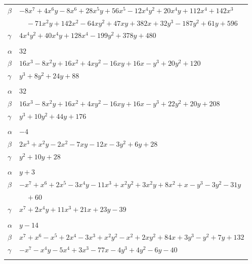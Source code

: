 \documentclass[11pt]{article}
\begin{document}
\begin{longtable}{@{}ll@{}}
$\beta$ & $-8x^{7}+4x^{6}y-8x^{6}+28x^{5}y+56x^{5}-12x^{4}y^{2}+20x^{4}y+112x^{4}+142x^{3}$\\
 & $\quad -71x^{2}y+142x^{2}-64xy^{2}+47xy+382x+32y^{3}-187y^{2}+61y+596$\\
$\gamma$ & $4x^{4}y^{2}+40x^{4}y+128x^{4}-199y^{2}+378y+480$\\
\addlinespace[3pt]
\multicolumn{2}{@{}l}{$\{i,j\}=\{37,38\}$, $k_{ij}=2^{5}\cdot 3$}\\
$\alpha$ & $32$\\
$\beta$ & $16x^{3}-8x^{2}y+16x^{2}+4xy^{2}-16xy+16x-y^{3}+20y^{2}+120$\\
$\gamma$ & $y^{3}+8y^{2}+24y+88$\\
\addlinespace[3pt]
\multicolumn{2}{@{}l}{$\{i,j\}=\{37,39\}$, $k_{ij}=2^{5}\cdot 5^{2}$}\\
$\alpha$ & $32$\\
$\beta$ & $16x^{3}-8x^{2}y+16x^{2}+4xy^{2}-16xy+16x-y^{3}+22y^{2}+20y+208$\\
$\gamma$ & $y^{3}+10y^{2}+44y+176$\\
\addlinespace[3pt]
\multicolumn{2}{@{}l}{$\{i,j\}=\{39,44\}$, $k_{ij}=2^{2}\cdot 3^{3}$}\\
$\alpha$ & $-4$\\
$\beta$ & $2x^{3}+x^{2}y-2x^{2}-7xy-12x-3y^{2}+6y+28$\\
$\gamma$ & $y^{2}+10y+28$\\
\addlinespace[3pt]
\multicolumn{2}{@{}l}{$\{i,j\}=\{40,43\}$, $k_{ij}=3^{4}$}\\
$\alpha$ & $y+3$\\
$\beta$ & $-x^{7}+x^{6}+2x^{5}-3x^{4}y-11x^{3}+x^{2}y^{2}+3x^{2}y+8x^{2}+x-y^{3}-3y^{2}-31y$\\
 & $\quad +60$\\
$\gamma$ & $x^{7}+2x^{4}y+11x^{3}+21x+23y-39$\\
\addlinespace[3pt]
\multicolumn{2}{@{}l}{$\{i,j\}=\{42,43\}$, $k_{ij}=2\cdot 3^{2}\cdot 11$}\\
$\alpha$ & $y-14$\\
$\beta$ & $x^{7}+x^{6}-x^{5}+2x^{4}-3x^{3}+x^{2}y^{2}-x^{2}+2xy^{2}+84x+3y^{3}-y^{2}+7y+132$\\
$\gamma$ & $-x^{7}-x^{4}y-5x^{4}+3x^{3}-77x-4y^{3}+4y^{2}-6y-40$\\
\addlinespace[3pt]
\end{longtable}
\endgroup
\end{document}
